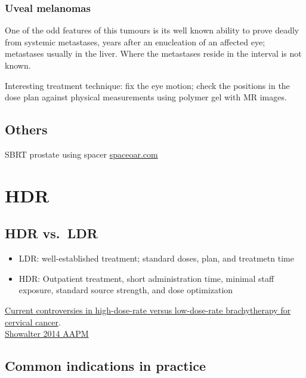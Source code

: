 \documentclass[]{book}
\providecommand{\tightlist}{%
  \setlength{\itemsep}{0pt}\setlength{\parskip}{0pt}}
\theoremstyle{definition}
\theoremstyle{definition}
\theoremstyle{definition}
\theoremstyle{remark}
\begin{document}
\subsection{Uveal melanomas}\label{uveal-melanomas}

One of the odd features of this tumours is its well known ability to
prove deadly from systemic metastases, years after an enucleation of an
affected eye; metastases usually in the liver. Where the metastases
reside in the interval is not known.

Interesting treatment technique: fix the eye motion; check the positions
in the dose plan against physical measurements using polymer gel with MR
images.

\section{Others}\label{others}

SBRT prostate using spacer
\href{https://www.spaceoar.com/physicians/clinical-publications/}{spaceoar.com}

\chapter{HDR}\label{hdr}

\section{HDR vs.~LDR}\label{hdr-vs.ldr}

\begin{itemize}
\tightlist
\item
  LDR: well-established treatment; standard doses, plan, and treatmetn
  time\\
\item
  HDR: Outpatient treatment, short administration time, minimal staff
  exposure, standard source strength, and dose optimization
\end{itemize}

\href{https://www.ncbi.nlm.nih.gov/pubmed/16874815}{Current
controversies in high-dose-rate versus low-dose-rate brachytherapy for
cervical cancer}.\\
\href{https://www.aapm.org/education/vl/vl.asp?id=3911\%5D}{Showalter
2014 AAPM}

\section{Common indications in
practice}\label{common-indications-in-practice}
\end{document}
